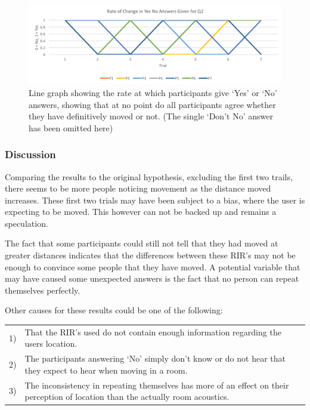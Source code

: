 \documentclass[../../main.tex]{subfiles}
\begin{document}
				\begin{figure}[H]
					\centerline{\includegraphics[scale = 0.7]{Sections/userTesting/images/test2/rateofchange.png}}
					\caption{Line graph showing the rate at which participants give `Yes' or `No' answers, showing that at no point do all participants agree whether they have definitively moved or not. (The single `Don't No' answer has been omitted here)}
					\label{test2rate}
				\end{figure}

			\subsubsection{Discussion}

				Comparing the results to the original hypothesis, excluding the first two trails, there seems to be more people noticing movement as the distance moved increases. These first two trials may have been subject to a bias, where the user is expecting to be moved. This however can not be backed up and remains a speculation. 

				 The fact that some participants could still not tell that they had moved at greater distances indicates that the differences between these \ac{RIR}'s may not be enough to convince some people that they have moved. A potential variable that may have caused some unexpected answers is the fact that no person can repeat themselves perfectly.

				Other causes for these results could be one of the following:

				\begin{tabular}{l p{}}
				1) & That the \ac{RIR}'s used do not contain enough information regarding the users location. \\
				2) & The participants answering `No' simply don't know or do not hear that they expect to hear when moving in a room.\\
				3) & The inconsistency in repeating themselves has more of an effect on their perception of location than the actually room acoustics.
				\end{tabular}
\end{document}
